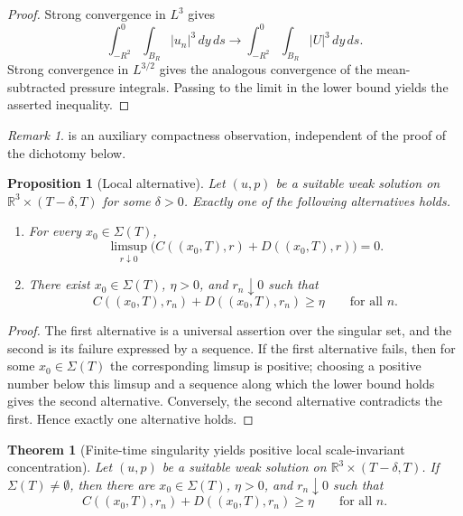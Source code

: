 \documentclass[11pt]{amsart}
\theoremstyle{plain}
\newtheorem{theorem}{Theorem}[section]
\newtheorem{proposition}[proposition]{Proposition}
\theoremstyle{definition}
\theoremstyle{remark}
\newtheorem{remark}[remark]{Remark}
\begin{document}
\begin{proof}
Strong convergence in \(L^3\) gives
\[
  \int_{-R^2}^{0}\int_{B_R}|u_n|^3\,dy\,ds
  \longrightarrow
  \int_{-R^2}^{0}\int_{B_R}|U|^3\,dy\,ds.
\]
Strong convergence in \(L^{3/2}\) gives the analogous convergence of the
mean-subtracted pressure integrals.  Passing to the limit in the lower bound
yields the asserted inequality.
\end{proof}

\begin{remark}
 is an auxiliary compactness observation,
independent of the proof of the dichotomy below.
\end{remark}

\begin{proposition}[Local alternative]\label{prop:local-alternative}
Let \((u,p)\) be a suitable weak solution on
\(\mathbb R^3\times(T-\delta,T)\) for some \(\delta>0\).  Exactly one of the
following alternatives holds.
\begin{enumerate}[label=\textup{(\roman*)}]
\item For every \(x_0\in\Sigma(T)\),
\[
  \limsup_{r\downarrow0}
  \bigl(C((x_0,T),r)+D((x_0,T),r)\bigr)=0.
\]
\item There exist \(x_0\in\Sigma(T)\), \(\eta>0\), and \(r_n\downarrow0\) such
that
\[
  C((x_0,T),r_n)+D((x_0,T),r_n)\ge\eta
  \qquad\text{for all }n.
\]
\end{enumerate}
\end{proposition}

\begin{proof}
The first alternative is a universal assertion over the singular set, and the
second is its failure expressed by a sequence.  If the first alternative fails,
then for some \(x_0\in\Sigma(T)\) the corresponding limsup is positive;
choosing a positive number below this limsup and a sequence along which the
lower bound holds gives the second alternative.  Conversely, the second
alternative contradicts the first.  Hence exactly one alternative holds.
\end{proof}

\begin{theorem}[Finite-time singularity yields positive local scale-invariant concentration]
\label{thm:singular-positive}
Let \((u,p)\) be a suitable weak solution on
\(\mathbb R^3\times(T-\delta,T)\).  If \(\Sigma(T)\ne\emptyset\), then there
are \(x_0\in\Sigma(T)\), \(\eta>0\), and \(r_n\downarrow0\) such that
\[
  C((x_0,T),r_n)+D((x_0,T),r_n)\ge\eta
  \qquad\text{for all }n.
\]
\end{theorem}
\end{document}
